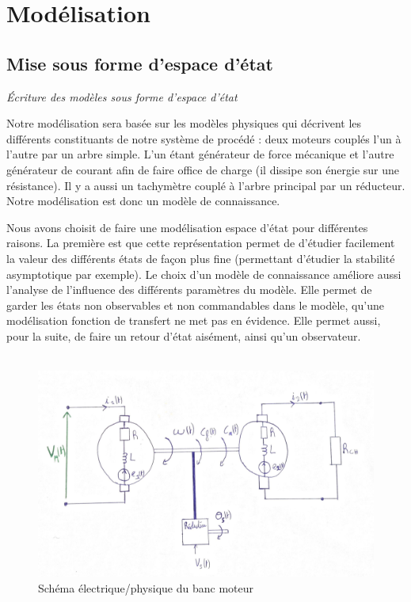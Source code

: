 \chapter{Modélisation}
\section{Mise sous forme d'espace d'état}
\textit{Écriture des modèles sous forme d'espace d'état}

Notre modélisation sera basée sur les modèles physiques qui décrivent les différents constituants de notre système de procédé : deux moteurs couplés l'un à l'autre par un arbre simple. L'un étant générateur de force mécanique et l'autre générateur de courant afin de faire office de charge (il dissipe son énergie sur une résistance). Il y a aussi un tachymètre couplé à l'arbre principal par un réducteur.
Notre modélisation est donc un modèle de connaissance.

Nous avons choisit de faire une modélisation espace d'état pour différentes raisons. La première est que cette représentation permet de d'étudier facilement la valeur des différents états de façon plus fine (permettant d'étudier la stabilité asymptotique par exemple). Le choix d'un modèle de connaissance améliore aussi l'analyse de l'influence des différents paramètres du modèle. Elle permet de garder les états non observables et non commandables dans le modèle, qu'une modélisation fonction de transfert ne met pas en évidence. Elle permet aussi, pour la suite, de faire un retour d'état aisément, ainsi qu'un observateur. \\ \\



\begin{figure}[!ht]
\centering
\includegraphics[width=.8\textwidth]{./I/images/schema0.png}
\caption{Schéma électrique/physique du banc moteur}
\label{fig:schema0}
\end{figure}

